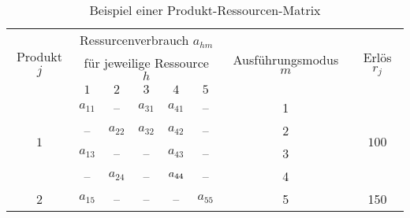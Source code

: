 \begin{table}[h!]
 \renewcommand{\arraystretch}{1.5}
  \setlength{\tabcolsep}{4mm}
  \begin{center}
    \caption{Beispiel einer Produkt-Ressourcen-Matrix}  \label{Tabelle0}
    \vspace*{3mm}
    \begin{tabular}{c|c|c|c|c|c|c|c}   %
     \multirow{3}{*}{Produkt $j$} & \multicolumn{5}{c|}{Ressurcenverbrauch $a_{hm}$} & \multirow{3}{*}{Ausführungsmodus $m$} & \multirow{3}{*}{Erlös $r_{j}$}\\
           & \multicolumn{5}{c|}{für jeweilige Ressource $h$} &  & \\ 
           & $1$ & $2$ & $3$ & $4$ &$5$ &  \\ \hline
         
         \multirow{4}{*}{$1$}  & $a_{11}$ & -- & $a_{31}$ & $a_{41}$ & -- & 1 &  \multirow{4}{*}{$100$}  \\ %
                & \cellcolor[gray]{0.9}--& \cellcolor[gray]{0.9}$a_{22}$ & \cellcolor[gray]{0.9}$a_{32}$ & \cellcolor[gray]{0.9}$a_{42}$ & \cellcolor[gray]{0.9}--& \cellcolor[gray]{0.9}2 & \\ %
                & $a_{13}$& --& --& $a_{43}$ & --& 3 &   \\ %
          &\cellcolor[gray]{0.9}--& \cellcolor[gray]{0.9}$a_{24}$& \cellcolor[gray]{0.9}-- & $\cellcolor[gray]{0.9}a_{44}$ & \cellcolor[gray]{0.9}--& \cellcolor[gray]{0.9}4 &   \\ \hline
                              2  & $a_{15}$ &-- & -- &--& $a_{55}$ & 5 &  150 \\ \hline
    \end{tabular} \\[3mm]
  \end{center}
\end{table}

